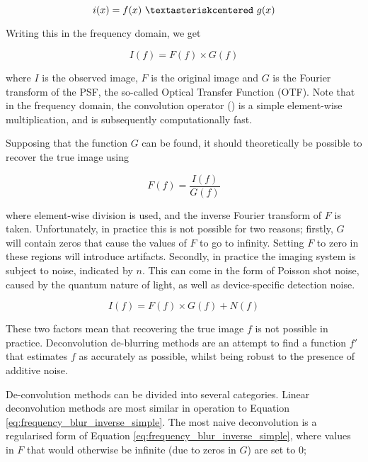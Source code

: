 \begin{equation}
\label{eq:spatial_blur_simple}
i(x) = f(x)~\textasteriskcentered~g(x)
\end{equation}

Writing this in the frequency domain, we get

\begin{equation}
\label{eq:frequency_blur_simple}
I(f) = F(f) \times G(f)
\end{equation}

where $I$ is the observed image, $F$ is the original image and $G$ is the Fourier transform of the PSF, the so-called Optical Transfer Function (OTF).
Note that in the frequency domain, the convolution operator (\textasteriskcentered) is a simple element-wise multiplication, and is subsequently computationally fast.

Supposing that the function $G$ can be found, it should theoretically be possible to recover the true image using

\begin{equation}
\label{eq:frequency_blur_inverse_simple}
F(f) = \frac{I(f)}{G(f)}
\end{equation}

where element-wise division is used, and the inverse Fourier transform of $F$ is taken.
Unfortunately, in practice this is not possible for two reasons; firstly, $G$ will contain zeros that cause the values of $F$ to go to infinity.
Setting $F$ to zero in these regions will introduce artifacts.
Secondly, in practice the imaging system is subject to noise, indicated by $n$.
This can come in the form of Poisson shot noise, caused by the quantum nature of light, as well as device-specific detection noise.

\begin{equation}
\label{eq:frequency_blur_full}
I(f) = F(f) \times G(f) + N(f)
\end{equation}

These two factors mean that recovering the true image $f$ is not possible in practice.
Deconvolution de-blurring methods are an attempt to find a function $f'$ that estimates $f$ as accurately as possible, whilst being robust to the presence of additive noise.

De-convolution methods can be divided into several categories.
Linear deconvolution methods are most similar in operation to Equation \ref{eq:frequency_blur_inverse_simple}.
The most naive deconvolution is a regularised form of Equation \ref{eq:frequency_blur_inverse_simple}, where values in $F$ that would otherwise be infinite (due to zeros in $G$) are set to 0;


